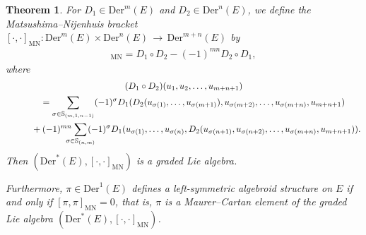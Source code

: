 \documentclass[10pt,a4paper]{amsart}
\numberwithin{equation}{section}
\newtheorem{thm}{Theorem}[section]
\newcommand{\lon }{\,\rightarrow\,}
\newcommand{\Der}{\mathrm{Der}}
\newcommand{\MN}{\mathrm{MN}}
\begin{document}
\begin{thm}\label{thm:graded-one}
 For $D_1\in \Der^m(E)$ and $D_2\in \Der^n(E)$, we define the Matsushima--Nijenhuis bracket $ [\cdot,\cdot]_{\MN}\colon \Der^m(E)\times \Der^n(E)\lon \Der^{m+n}(E)$ by
 \begin{gather*}%
 [D_1,D_2]_{\MN}=D_1\circ D_2-(-1)^{mn}D_2\circ D_1,
 \end{gather*}
 where
 \begin{gather*}
(D_1\circ D_2)(u_1,u_2,\dots,u_{m+n+1})
\\ \qquad
{}=\sum_{\sigma\in \mathbb{S}_{(m,1,n-1)}}(-1)^{\sigma}D_1 (D_2(u_{\sigma(1)},\dots,u_{\sigma(m+1)}),u_{\sigma(m+2)},\dots,u_{\sigma(m+n)},u_{m+n+1})
\\ \qquad\hphantom{=}
{}+(-1)^{mn}\!\!\!\!\!\sum_{\sigma\in \mathbb{S}_{(n,m)}}\!\!\!\!\!(-1)^{\sigma}D_1
(u_{\sigma(1)},\dots,u_{\sigma(n)},D_2(u_{\sigma(n+1)},u_{\sigma(n+2)},\dots,u_{\sigma(m+n)},u_{m+n+1})).
\end{gather*}
Then $(\Der^*(E),[\cdot,\cdot]_{\MN})$ is a graded Lie algebra.

Furthermore, $\pi\in\Der^1(E)$ defines a left-symmetric algebroid structure on $E$ if and only if $[\pi,\pi]_{\MN}=0$, that is, $\pi$ is a Maurer--Cartan element of the graded Lie algebra $(\Der^*(E),[\cdot,\cdot]_{\MN})$.
\end{thm}
\end{document}
